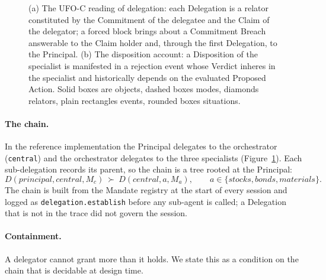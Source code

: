 \documentclass[runningheads]{llncs}
\newcommand{\code}[1]{\texttt{#1}}
\begin{document}
\begin{figure}[tb]
\medskip
{}
\caption{(a) The UFO-C reading of delegation: each Delegation is a relator constituted by the Commitment of the delegatee and the Claim of the delegator; a forced block brings about a Commitment Breach answerable to the Claim holder and, through the first Delegation, to the Principal. (b) The disposition account: a Disposition of the specialist is manifested in a rejection event whose Verdict inheres in the specialist and historically depends on the evaluated Proposed Action. Solid boxes are objects, dashed boxes modes, diamonds relators, plain rectangles events, rounded boxes situations.}
\label{fig:model}
\end{figure}

\paragraph{The chain.}
In the reference implementation the Principal delegates to the orchestrator (\code{central}) and the orchestrator delegates to the three specialists (Figure~\ref{fig:model}). Each sub-delegation records its parent, so the chain is a tree rooted at the Principal:
\[
D(\mathit{principal}, \mathit{central}, M_c)\ \succ\ D(\mathit{central}, a, M_a),\qquad a \in \{\mathit{stocks}, \mathit{bonds}, \mathit{materials}\}.
\]
The chain is built from the Mandate registry at the start of every session and logged as \code{delegation.establish} before any sub-agent is called; a Delegation that is not in the trace did not govern the session.

\paragraph{Containment.}
A delegator cannot grant more than it holds. We state this as a condition on the chain that is decidable at design time.
\end{document}
